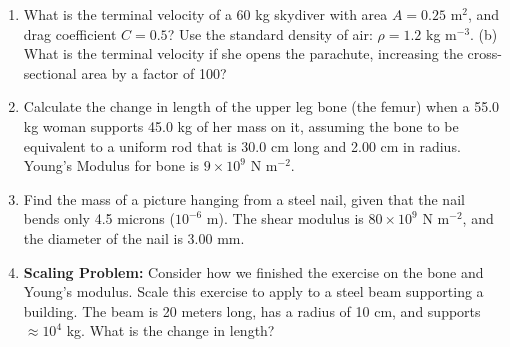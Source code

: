\documentclass[10pt]{article}
\begin{document}
\begin{enumerate}
\item What is the terminal velocity of a 60 kg skydiver with area $A = 0.25$ m$^2$, and drag coefficient $C = 0.5$?  Use the standard density of air: $\rho = 1.2$ kg m$^{-3}$. (b) What is the terminal velocity if she opens the parachute, increasing the cross-sectional area by a factor of 100? \\ \vspace{4cm}
\item Calculate the change in length of the upper leg bone (the femur) when a 55.0 kg woman supports 45.0 kg of her mass on it, assuming the bone to be equivalent to a uniform rod that is 30.0 cm long and 2.00 cm in radius. Young's Modulus for bone is $9 \times 10^9$ N m$^{-2}$. \\ \vspace{4cm}
\item Find the mass of a picture hanging from a steel nail, given that the nail bends only 4.5 microns ($10^{-6}$ m).  The shear modulus is $80 \times 10^9$ N m$^{-2}$, and the diameter of the nail is 3.00 mm. \\ \vspace{4cm}
\item \textbf{Scaling Problem:} Consider how we finished the exercise on the bone and Young's modulus.  Scale this exercise to apply to a steel beam supporting a building.  The beam is 20 meters long, has a radius of 10 cm, and supports $\approx 10^4$ kg.  What is the change in length?
\end{enumerate}
\end{document}
